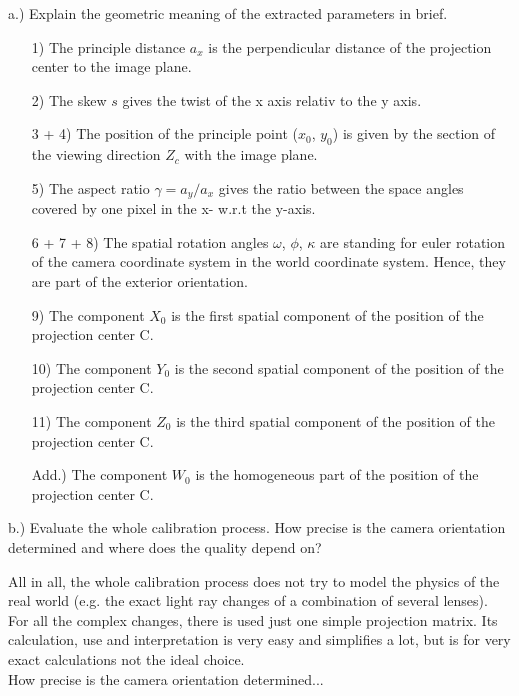 \documentclass[a4paper,headings=small]{scrartcl}
\numberwithin{equation}{section} %
\numberwithin{figure}{section}   %
\begin{document}
a.) Explain the geometric meaning of the extracted parameters in brief.

\begin{enumerate}
\item[1)] The principle distance $a_x$ is the perpendicular distance of the projection center
to the image plane.
\item[2)] The skew $s$ gives the twist of the x axis relativ to the y axis.
\item[3 + 4)] The position of the principle point ($x_0$, $y_0$) is given by the section of the 
viewing direction $Z_c$ with the image plane.
\item[5)] The aspect ratio $\gamma=a_y/a_x$ gives the ratio between the space angles covered
by one pixel in the x- w.r.t the y-axis.
\item[6 + 7 + 8)] The spatial rotation angles $\omega$, $\phi$, $\kappa$ are standing for euler rotation of the camera coordinate system in the
world coordinate system. Hence, they are part of the exterior orientation.
\item[9)] The component $X_0$ is the first spatial component of the position of the projection center C.\\
\item[10)] The component $Y_0$ is the second spatial component of the position of the projection center C.\\
\item[11)] The component $Z_0$ is the third spatial component of the position of the projection center C.\\
\item[Add.)] The component $W_0$ is the homogeneous part of the position of the projection center C.\\
\end{enumerate} 

b.) Evaluate the whole calibration process. How precise is the camera
orientation determined and where does the quality depend on?

All in all, the whole calibration process does not try to model the physics of the real world
(e.g. the exact light ray changes of a combination of several lenses).
For all the complex changes, there is used just one simple projection matrix.
Its calculation, use and interpretation is very easy and simplifies a lot,
but is for very exact calculations not the ideal choice.\\ 

How precise is the camera orientation determined...\\
\end{document}
